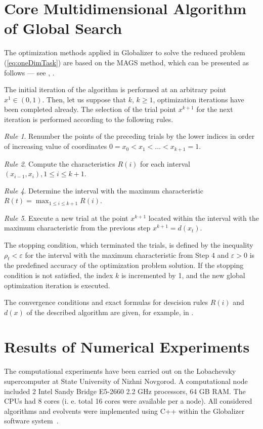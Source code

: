 \documentclass[procedia]{easychair}
\begin{document}
\section{Core Multidimensional Algorithm of Global Search}

The optimization methods applied in Globalizer to solve the reduced problem
(\ref{eq:oneDimTask}) are based on the MAGS method, which can be presented as follows ---
see \cite{strongin1978}, \cite{strSergGO}.
\par
The initial iteration of the algorithm is performed at an arbitrary point \mbox{\(x^1\in(0,1)\)}.
Then, let us suppose that \(k\), \(k\ge 1\), optimization iterations have been completed already.
The selection of the trial point \(x^{k+1}\) for the next iteration is performed according to the
following rules.

\textit{Rule 1}. Renumber the points of the preceding trials by the lower indices in order of
increasing value of coordinates
$0=x_0<x_1<...<x_{k+1}=1$.

\textit{Rule 2}. Compute the characteristics \(R(i)\) for each interval \((x_{i-1},x_i),1\leq i\leq
k+1\).

\textit{Rule 4}. Determine the interval with the maximum characteristic $R(t)=\max_{1\leq i
\leq k+1}R(i)$.

\textit{Rule 5}. Execute a new trial at the point \(x^{k+1}\) located within the interval with the
maximum characteristic from the previous step
  $x^{k+1}=d(x_t)$.

The stopping condition, which terminated the trials, is defined by the inequality
$\rho_t<\varepsilon$
for the interval with the maximum characteristic from Step 4 and \(\varepsilon >0\) is the
predefined
accuracy of the optimization problem solution. If the stopping condition is not satisfied,
the index \(k\) is incremented by 1, and the new global optimization iteration is executed.

The convergence conditions and exact formulas for descision rules $R(i)$ and $d(x)$ of the
described algorithm are given, for example, in \cite{strSergGO}.

\section{Results of Numerical Experiments}

The computational experiments have been carried out on the Lobachevsky supercomputer at
State University of Nizhni Novgorod. A computational node included 2 Intel
Sandy Bridge E5-2660 2.2 GHz processors, 64 GB RAM. The CPUs had 8 cores (i. e. total 16
cores were available per a node). All considered algorithms and evolvents were implemented
using C++ within the Globalizer software system~\cite{globalizerSystem}.
\end{document}
